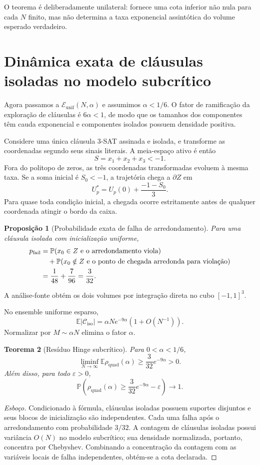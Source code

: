 \documentclass[11pt,a4paper]{article}
\newtheorem{theorem}{Teorema}[section]
\newtheorem{proposition}[theorem]{Proposição}
\begin{document}
O teorema é deliberadamente unilateral: fornece uma cota inferior não nula para cada $N$ finito, mas não determina a taxa exponencial assintótica do volume esperado verdadeiro.

\section{Dinâmica exata de cláusulas isoladas no modelo subcrítico}
Agora passamos a $\mathcal E_{\mathrm{unif}}(N,\alpha)$ e assumimos $\alpha<1/6$. O fator de ramificação da exploração de cláusulas é $6\alpha<1$, de modo que os tamanhos dos componentes têm cauda exponencial e componentes isolados possuem densidade positiva.

Considere uma única cláusula 3-SAT assinada e isolada, e transforme as coordenadas segundo seus sinais literais. A meia-espaço ativo é então
\[
S=x_1+x_2+x_3<-1.
\]
Fora do politopo de zeros, as três coordenadas transformadas evoluem à mesma taxa. Se a soma inicial é $S_0<-1$, a trajetória chega a $\partial Z$ em
\begin{equation}
U_p^*=U_p(0)+\frac{-1-S_0}{3}.
\end{equation}
Para quase toda condição inicial, a chegada ocorre estritamente antes de qualquer coordenada atingir o bordo da caixa.

\begin{proposition}[Probabilidade exata de falha de arredondamento]
Para uma cláusula isolada com inicialização uniforme,
\begin{align}
p_{\mathrm{fail}}
&=\mathbb P(x_0\in Z\text{ e o arredondamento viola})\notag\\
&\quad+\mathbb P(x_0\notin Z\text{ e o ponto de chegada arredonda para violação})\notag\\
&=\frac1{48}+\frac7{96}=\frac3{32}.
\end{align}
\end{proposition}
A análise-fonte obtém os dois volumes por integração direta no cubo $[-1,1]^3$.

No ensemble uniforme esparso,
\[
\mathbb E|\mathcal C_{\mathrm{iso}}|
=\alpha N e^{-9\alpha}(1+O(N^{-1})).
\]
Normalizar por $M\sim\alpha N$ elimina o fator $\alpha$.

\begin{theorem}[Resíduo Hinge subcrítico]
Para $0<\alpha<1/6$,
\[
\liminf_{N\to\infty}\mathbb E\rho_{\mathrm{quad}}(\alpha)
\ge\frac3{32}e^{-9\alpha}>0.
\]
Além disso, para todo $\varepsilon>0$,
\[
\mathbb P\!\left(\rho_{\mathrm{quad}}(\alpha)
\ge\frac3{32}e^{-9\alpha}-\varepsilon\right)\to1.
\]
\end{theorem}
\begin{proof}[Esboço]
Condicionado à fórmula, cláusulas isoladas possuem suportes disjuntos e seus blocos de inicialização são independentes. Cada uma falha após o arredondamento com probabilidade $3/32$. A contagem de cláusulas isoladas possui variância $O(N)$ no modelo subcrítico; sua densidade normalizada, portanto, concentra por Chebyshev. Combinando a concentração da contagem com as variáveis locais de falha independentes, obtém-se a cota declarada.
\end{proof}
\end{document}
